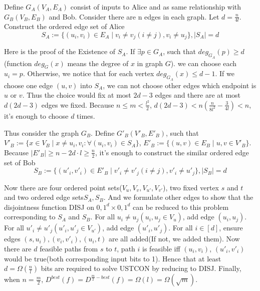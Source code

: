 \documentclass[10pt, fleqn, a4paper]{report}
\begin{document}
Define $G_A(V_A,E_A)$ consist of inputs to Alice and as same relationship with $G_B(V_B,E_B)$ and Bob. Consider there are n edges in each graph. Let $d = \frac{n}{4l}$. Construct the ordered edge set of Alice$$S_A := \{(u_i, v_i) \in E_A \mid v_i \neq v_j(i \neq j), v_i \neq u_j\}, |S_A| = d$$

Here is the proof of the Existence of $S_A$. If $\exists p \in G_A$, such that $deg_{G_A}(p) \geq d$ (function $deg_{G}(x)$ means the degree of $x$ in graph $G$). we can choose each $u_i = p$. Otherwise, we notice that for each vertex $deg_{G_A}(x) \leq d - 1$. If we choose one edge $(u,v)$ into $S_A$, we can not choose other edges which endpoint is $u$ or $v$. Thus the choice would fix at most $2d-3$ edges and there are at most$d(2d-3)$ edges we fixed. Because $n \leq m < \frac{l^2}{2}$, $d(2d-3) < n(\frac{n}{8l^2}-\frac{3}{4l}) < n$, it's enough to choose $d$ times.

Thus consider the graph $G_B$. Define $G'_B(V'_B, E'_B)$, such that $V'_B := \{x \in V_B \mid x \neq u_i,v_i : \forall (u_i,v_i) \in S_A\}$, $E'_B := \{ (u,v) \in E_B \mid u,v \in V'_B \}$. Because $|E'_B| \geq n - 2d \cdot l \geq \frac{n}{2}$, it's enough to construct the similar ordered edge set of Bob$$S_B := \{(u'_i, v'_i) \in E'_B \mid v'_i \neq v'_j(i \neq j), v'_i \neq u'_j\}, |S_B| = d$$

Now there are four ordered point sets($V_u,V_v,V_{u'},V_{v'}$), two fixed vertex $s$ and $t$ and two ordered edge sets$S_A, S_B$. And we formulate other edges to show that the disjointness function DISJ on ${0,1}^d \times {0,1}^d$ can be reduced to this problem corresponding to $S_A$ and $S_B$. For all $u_i \neq u_j(u_i,u_j \in V_u)$, add edge $(u_i, u_j)$. For all $u'_i \neq u'_j(u'_i,u'_j \in V_{u'})$, add edge $(u'_i, u'_j)$. For all $i \in [d]$, ensure edges $(s, u_i), (v_i,v'_i), (u_i, t)$ are all added(If not, we added them). Now there are $d$ feasible paths from $s$ to $t$, path $i$ is feasible iff $(u_i,v_i)$, $(u'_i,v'_i)$ would be true(both corresponding input bits to 1). Hence that at least $d = \Omega(\frac{n}{l})$ bits are required to solve USTCON by reducing to DISJ. Finally, when $n = \frac{m}{2}$, $D^{best}(f) = D^{\frac{m}{2}-best}(f) = \Omega(l) = \Omega(\sqrt{m})$.
\end{document}
